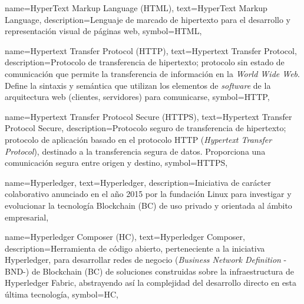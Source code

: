 {
    name={HyperText Markup Language (HTML)},
    text={HyperText Markup Language},
    description={Lenguaje de marcado de hipertexto para el desarrollo y representación visual de páginas web},
    symbol={HTML},
}
		
{
    name={Hypertext Transfer Protocol (HTTP)},
    text={Hypertext Transfer Protocol},
    description={Protocolo de transferencia de hipertexto; protocolo sin estado de comunicación que permite la transferencia de información en la \textit{World Wide Web}. Define la sintaxis y semántica que utilizan los elementos de \textit{software} de la arquitectura web (clientes, servidores) para comunicarse},
    symbol={HTTP},
}
			
{
    name={Hypertext Transfer Protocol Secure (HTTPS)},
    text={Hypertext Transfer Protocol Secure},
    description={Protocolo seguro de transferencia de hipertexto; protocolo de aplicación basado en el protocolo HTTP (\textit{Hypertext Transfer Protocol}), destinado a la transferencia segura de datos. Proporciona una comunicación segura entre origen y destino},
    symbol={HTTPS},
}
		
{
    name={Hyperledger},
    text={Hyperledger},
    description={Iniciativa de carácter colaborativo anunciado en el año 2015 por la fundación Linux para investigar y evolucionar la tecnología Blockchain (BC) de uso privado y orientada al ámbito empresarial},
}

{
    name={Hyperledger Composer (HC)},
    text={Hyperledger Composer},
    description={Herramienta de código abierto, perteneciente a la iniciativa Hyperledger, para desarrollar redes de negocio (\textit{Business Network Definition} -BND-) de Blockchain (BC) de soluciones construidas sobre la infraestructura de Hyperledger Fabric, abstrayendo así la complejidad del desarrollo directo en esta última tecnología},
    symbol={HC},
}

